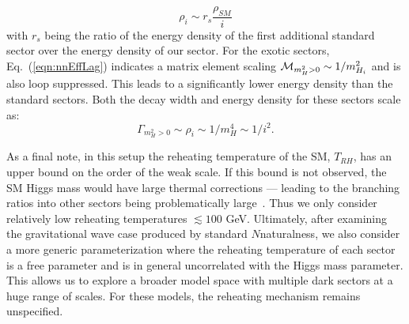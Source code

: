 \documentclass[nofootinbib,twocolumn,preprintnumbers]{revtex4-1}
\begin{document}
\begin{equation}\label{eqn:edSS}
\rho_i \sim r_{s}\frac{\rho_{SM}}{i}
\end{equation} 
with $r_s$ being the ratio of the energy density of the first additional standard sector over the energy density of our sector.
For the exotic sectors, Eq.~(\ref{eqn:nnEffLag}) indicates a matrix element scaling ${\cal M}_{m_H^2>0} \sim 1/m_{H_i}^2$ and is also loop suppressed. 
This leads to a significantly lower energy density than the standard sectors. Both the decay width and energy density for these sectors scale as: 
\begin{equation}
\Gamma_{m_H^2>0} \sim \rho_i \sim 1/m_H^4 \sim 1/i^2.
\label{eq:reheat_exotic}
\end{equation} 

As a final note, in this setup the reheating temperature of the SM, $T_{RH}$, has an upper bound on the order of the weak scale. If this bound is not observed, the SM Higgs mass would have large thermal corrections --- leading to the branching ratios into other sectors being problematically large~\citep{Arkani-Hamed:2016rle}. Thus we only consider relatively low reheating temperatures $\lesssim 100$ GeV.
Ultimately, after examining the gravitational wave case produced by standard $N$naturalness, we also consider a more generic parameterization where the reheating temperature of each sector is a free parameter and is in general uncorrelated with the Higgs mass parameter. This allows us to explore a broader model space with multiple dark sectors at a huge range of scales. For these models, the reheating mechanism remains unspecified.
\end{document}
